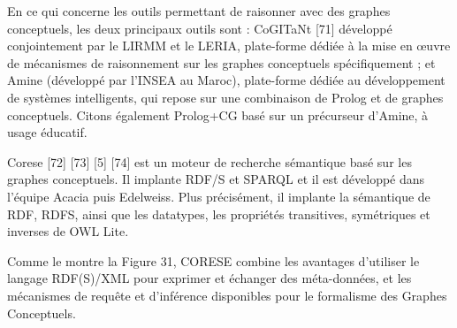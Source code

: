 En ce qui concerne les outils permettant de raisonner avec des graphes conceptuels, les deux principaux outils sont : CoGITaNt [71] développé conjointement par le LIRMM et le LERIA, plate-forme dédiée à la mise en œuvre de mécanismes de raisonnement sur les graphes conceptuels spécifiquement ; et Amine (développé par l'INSEA au Maroc), plate-forme dédiée au développement de systèmes intelligents, qui repose sur une combinaison de Prolog et de graphes conceptuels. Citons également Prolog+CG basé sur un précurseur d'Amine, à usage éducatif.

Corese [72] [73] [5] [74] est un moteur de recherche sémantique basé sur les graphes conceptuels. Il implante RDF/S et SPARQL et il est développé dans l’équipe Acacia puis Edelweiss. Plus précisément, il implante la sémantique de RDF, RDFS, ainsi que les datatypes, les propriétés transitives, symétriques et inverses de OWL Lite.

Comme le montre la Figure 31, CORESE combine les avantages d'utiliser le langage RDF(S)/XML pour exprimer et échanger des méta-données, et les mécanismes de requête et d'inférence disponibles pour le formalisme des Graphes Conceptuels.



